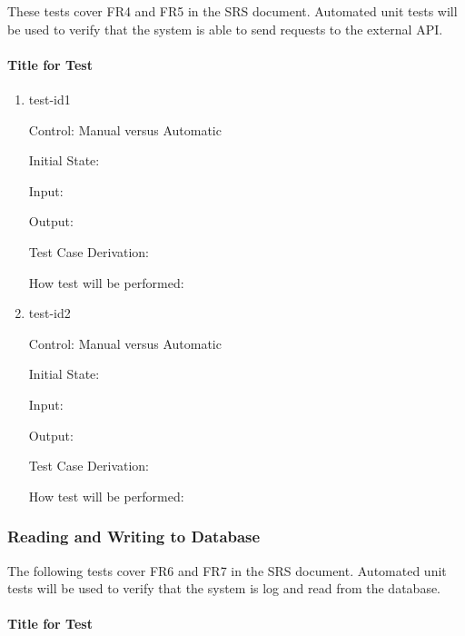 \documentclass[12pt, titlepage]{article}
\begin{document}
These tests cover  FR4 and FR5 in the SRS document. Automated unit tests will be used to verify that the system is able to send requests to the external API.

\paragraph{Title for Test}

\begin{enumerate}
	
	\item{test-id1\\}
	
	Control: Manual versus Automatic
	
	Initial State: 
	
	Input: 
	
	Output: 
	
	Test Case Derivation: 
	
	How test will be performed: 
	
	\item{test-id2\\}
	
	Control: Manual versus Automatic
	
	Initial State: 
	
	Input: 
	
	Output: 
	
	Test Case Derivation: 
	
	How test will be performed: 
	
\end{enumerate}

\subsubsection{Reading and Writing to Database}

The following tests cover  FR6 and FR7 in the SRS document. Automated unit tests will be used to verify that the system is log and read from the database.

\paragraph{Title for Test}
\end{document}
